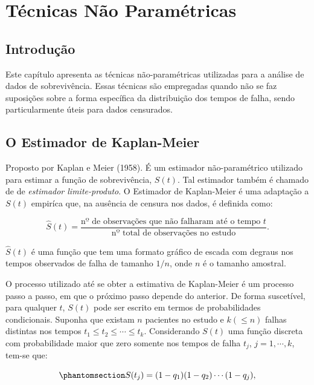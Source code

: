 \documentclass[
  12pt,
  letterpaper,
  DIV=11,
  numbers=noendperiod]{scrreprt}
\begin{document}

\chapter{Técnicas Não
Paramétricas}\label{tuxe9cnicas-nuxe3o-paramuxe9tricas}

\section{Introdução}\label{introduuxe7uxe3o-1}

Este capítulo apresenta as técnicas não-paramétricas utilizadas para a
análise de dados de sobrevivência. Essas técnicas são empregadas quando
não se faz suposições sobre a forma específica da distribuição dos
tempos de falha, sendo particularmente úteis para dados censurados.

\section{O Estimador de Kaplan-Meier}\label{o-estimador-de-kaplan-meier}

Proposto por Kaplan e Meier (1958). É um estimador não-paramétrico
utilizado para estimar a função de sobrevivência, \(S(t)\). Tal
estimador também é chamado de de \textit{estimador limite-produto}. O
Estimador de Kaplan-Meier é uma adaptação a \(S(t)\) empiríca que, na
ausência de censura nos dados, é definida como:

\[
\hat{S}(t) = \dfrac{\text{nº de observações que não falharam até o tempo } t}{\text{nº total de observações no estudo}}.
\]

\noindent \(\hat{S}(t)\) é uma função que tem uma formato gráfico de
escada com degraus nos tempos observados de falha de tamanho \(1/n\),
onde \(n\) é o tamanho amostral.

O processo utilizado até se obter a estimativa de Kaplan-Meier é um
processo passo a passo, em que o próximo passo depende do anterior. De
forma suscetível, para qualquer \(t\), \(S(t)\) pode ser escrito em
termos de probabilidades condicionais. Suponha que existam \(n\)
pacientes no estudo e \(k (\leq n)\) falhas distintas nos tempos
\(t_{1} \leq t_{2} \leq \cdots \leq t_{k}\). Considerando \(S(t)\) uma
função discreta com probabilidade maior que zero somente nos tempos de
falha \(t_{j}\), \(j = 1, \cdots, k\), tem-se que:

\begin{equation}\phantomsection\label{eq-DecomposeSt}{
S(t_{j}) = (1 - q_{1}) (1 - q_{2}) \cdots (1 - q_{j}),
}\end{equation}
\end{document}
